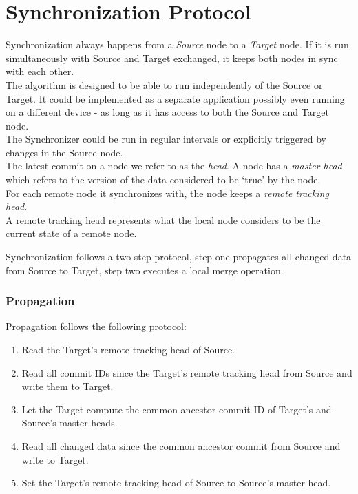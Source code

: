 \section{Synchronization Protocol}
\label{sec:main.protocol}
Synchronization always happens from a \emph{Source} node to a \emph{Target} node.
If it is run simultaneously with Source and Target exchanged, it keeps both nodes in sync with each other.\\
The algorithm is designed to be able to run independently of the Source or Target.
It could be implemented as a separate application possibly even running on a different device - as long as it has access to both the Source and Target node.\\
The Synchronizer could be run in regular intervals or explicitly triggered by changes in the Source node.\\

The latest commit on a node we refer to as the \emph{head}.
A node has a \emph{master head} which refers to the version of the data considered to be `true' by the node.\\
For each remote node it synchronizes with, the node keeps a \emph{remote tracking head}.\\
A remote tracking head represents what the local node considers to be the current state of a remote node.

Synchronization follows a two-step protocol, step one propagates all changed data from Source to Target, step two executes a local merge operation.

\subsubsection{Propagation}
Propagation follows the following protocol:

\begin{enumerate}
\item Read the Target's remote tracking head of Source.
\item Read all commit IDs since the Target's remote tracking head from Source and write them to Target.
\item Let the Target compute the common ancestor commit ID of Target's and Source's master heads.
\item Read all changed data since the common ancestor commit from Source and write to Target.
\item Set the Target's remote tracking head of Source to Source's master head.
\end{enumerate}

